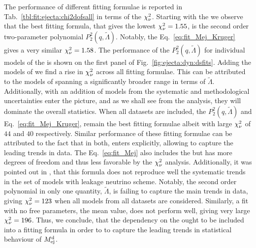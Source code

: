 The performance of different fitting formulae is reported in  
Tab.~\ref{tbl:fit:ejecta:chi2dofsall} in terms of the $\chi_{\nu}^2$.
%
Starting with the \DSrefset{} we observe that the best fitting formula, that gives the 
lowest $\chi_{\nu}^2=1.55$, is the second order two-parameter polynomial $P_2^2(q,\tilde{\Lambda})$.
Notably, the Eq.~\eqref{eq:fit_Mej_Kruger} gives a very similar $\chi_{\nu}^2=1.58$.
%
The performance of the $P_2^2(q,\tilde{\Lambda})$ for individual models of the \DSrefset{} 
is shown on the first panel of Fig.~\ref{fig:ejecta:dyn:dsfits}.
%
%
%
Adding the models of \DSheatcool{} we find a rise in $\chi_{\nu}^2$ across all fitting formulae. 
This can be attributed to the models of \DSheatcool{} spanning a significantly broader range 
in terms of $\tilde{\Lambda}$. Additionally, with an addition of models from \DSheatcool{} 
the systematic and methodological uncertainties enter the picture, and as we shall see from 
the analysis, they will dominate the overall statistics.
%
When all datasets are included, the $P_2^2(q,\tilde{\Lambda})$ and 
Eq.~\eqref{eq:fit_Mej_Kruger}, remain the best fitting formulae albeit with large 
$\chi_{\nu}^2$ of $44$ and $40$ respectively.
%
Similar performance of these fitting formulae can be attributed to the fact that in 
both, \mr{} enters explicitly, allowing to capture the leading trends in data.
The Eq.~\eqref{eq:fit_Mej} also includes the \mr{} but has more degrees of freedom and 
thus less favorable by the $\chi_{\nu}^2$ analysis. Additionally, it was pointed out in 
\citet{Radice:2018pdn}, that this formula does not reproduce well the systematic 
trends in the set of models with leakage neutrino scheme.
%
Notably, the second order polynomial in only one quantity, $\tilde{\Lambda}$, is failing to 
capture the main trends in data, giving $\chi_{\nu}^2=123$ when all models from all datasets are 
considered. Similarly, a fit with no free parameters, the mean value, does not perform well, 
giving very large $\chi_{\nu}^2=196$.
%
Thus, we conclude, that the dependency on the \mr{} ought to be included into a fitting 
formula in order to to capture the leading trends in statistical behaviour of $M^{\text{d}}_{\text{ej}}$.


